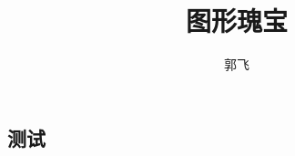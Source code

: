 \documentclass[11pt,a4paper,twoside]{book}
\author{郭飞}
\title{图形瑰宝 }
\begin{document}
\begin{CJK}{UTF8}{gbsn}

\maketitle


\newpage
\part{测试}

\end{CJK}
\end{document}
